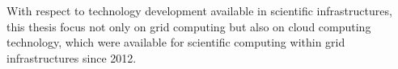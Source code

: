 With respect to technology development available in scientific infrastructures, this thesis focus not only on grid computing but also on cloud computing technology, which were available for scientific computing within grid infrastructures since 2012.


